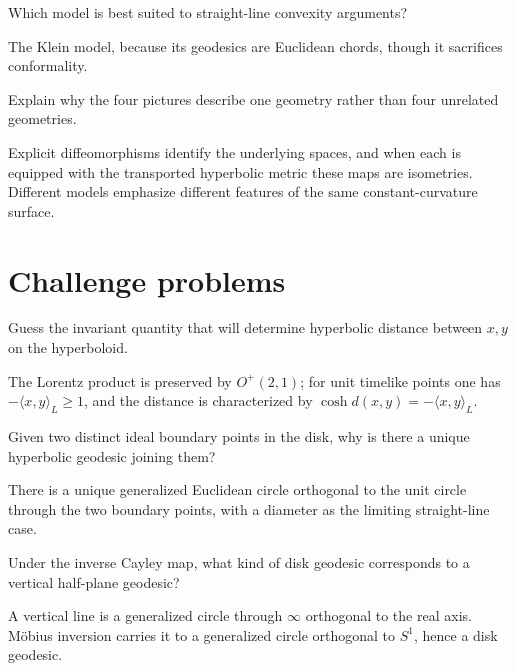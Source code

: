 \begin{problem}\label{prob:vii31-11}
Which model is best suited to straight-line convexity arguments?
\end{problem}
\begin{solution}
The Klein model, because its geodesics are Euclidean chords, though it sacrifices conformality.
\end{solution}

\begin{problem}\label{prob:vii31-12}
Explain why the four pictures describe one geometry rather than four unrelated geometries.
\end{problem}
\begin{solution}
Explicit diffeomorphisms identify the underlying spaces, and when each is equipped with the transported hyperbolic metric these maps are isometries. Different models emphasize different features of the same constant-curvature surface.
\end{solution}

\section{Challenge problems}
\begin{problem}\label{prob:vii31-ch01}
Guess the invariant quantity that will determine hyperbolic distance between \(x,y\) on the hyperboloid.
\end{problem}
\begin{solution}
The Lorentz product is preserved by \(O^+(2,1)\); for unit timelike points one has \(-\langle x,y\rangle_L\ge1\), and the distance is characterized by \(\cosh d(x,y)=-\langle x,y\rangle_L\).
\end{solution}

\begin{problem}\label{prob:vii31-ch02}
Given two distinct ideal boundary points in the disk, why is there a unique hyperbolic geodesic joining them?
\end{problem}
\begin{solution}
There is a unique generalized Euclidean circle orthogonal to the unit circle through the two boundary points, with a diameter as the limiting straight-line case.
\end{solution}

\begin{problem}\label{prob:vii31-ch03}
Under the inverse Cayley map, what kind of disk geodesic corresponds to a vertical half-plane geodesic?
\end{problem}
\begin{solution}
A vertical line is a generalized circle through \(\infty\) orthogonal to the real axis. Möbius inversion carries it to a generalized circle orthogonal to \(S^1\), hence a disk geodesic.
\end{solution}

